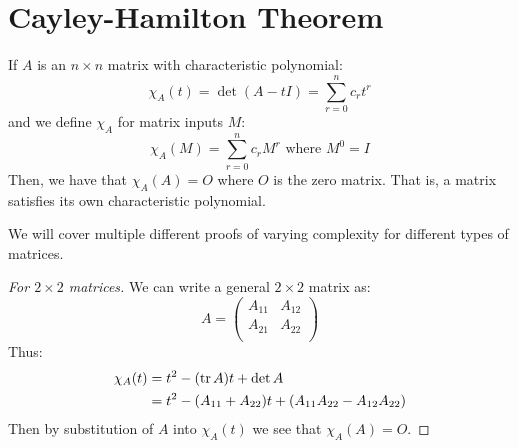 \documentclass[../main.tex]{subfiles}
\begin{document}
\section{Cayley-Hamilton Theorem}
\begin{theorem}
  If $A$ is an $n \times n$ matrix with characteristic polynomial:
  \[
    \chi_A(t) = \det(A - tI) = \sum_{r = 0}^{n} c_r t^{r}
  \]
  and we define $\chi_A$ for matrix inputs $M$:
  \[
    \chi_A(M) = \sum_{r = 0}^{n} c_r M^{r} \text{ where } M^{0} = I
  \]
  Then, we have that $\chi_A(A) = O$ where $O$ is the zero matrix.
  That is, a matrix satisfies its own characteristic polynomial.
\end{theorem}
We will cover multiple different proofs of varying complexity for different types of matrices.
\begin{proof}[For $2 \times 2$ matrices]
  We can write a general $2 \times 2$ matrix as:
  \[
    A = \begin{pmatrix}
    A_{1 1} & A_{1 2} \\
    A_{2 1} & A_{2 2} \\
    \end{pmatrix}
  \]
  Thus:
  \begin{align*}
    \chi_A(t) &= t^2 - (\operatorname{tr} A)t + \det A \\
              &= t^2 - (A_{1 1} + A_{2 2})t + (A_{1 1}A_{2 2} - A_{1 2}A_{2 2})
  \end{align*}
  Then by substitution of $A$ into $\chi_A(t)$ we see that $\chi_A(A) = O$.
\end{proof}
\end{document}
